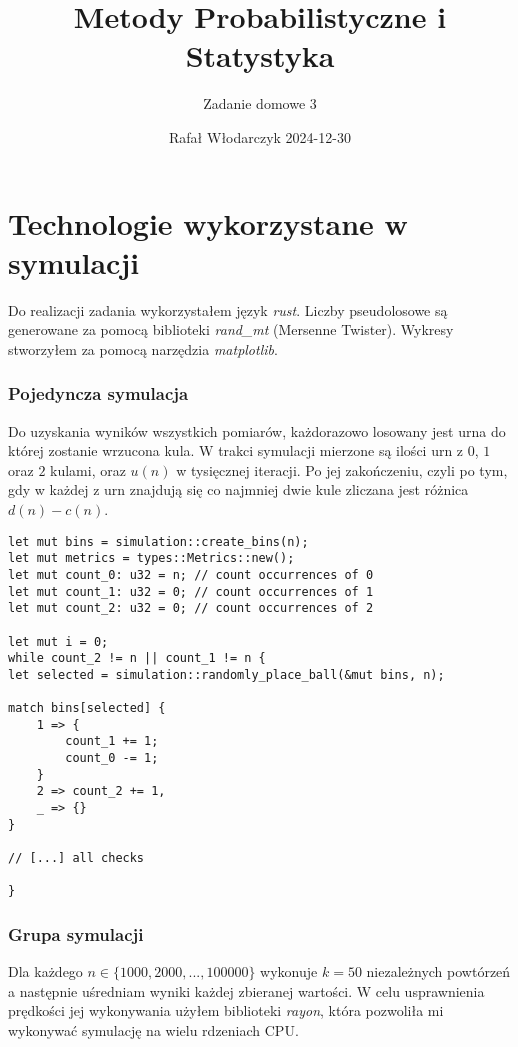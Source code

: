 \documentclass{article}
\title{Metody Probabilistyczne i Statystyka}
\author{Zadanie domowe 3}
\date{Rafał Włodarczyk 2024-12-30}
\begin{document}
\maketitle

\tableofcontents

\section{Technologie wykorzystane w symulacji}

Do realizacji zadania wykorzystałem język \textit{rust}. Liczby pseudolosowe są generowane za pomocą biblioteki \textit{rand\_mt} (Mersenne Twister). Wykresy stworzyłem za pomocą narzędzia \textit{matplotlib}. 

\subsubsection{Pojedyncza symulacja}

Do uzyskania wyników wszystkich pomiarów, każdorazowo losowany jest urna do której zostanie wrzucona kula. W trakci symulacji mierzone są ilości urn z $0$, $1$ oraz $2$ kulami, oraz $u(n)$ w tysięcznej iteracji. Po jej zakończeniu, czyli po tym, gdy w każdej z urn znajdują się co najmniej dwie kule zliczana jest różnica $d(n)-c(n)$.

\begin{verbatim}
let mut bins = simulation::create_bins(n);
let mut metrics = types::Metrics::new();
let mut count_0: u32 = n; // count occurrences of 0
let mut count_1: u32 = 0; // count occurrences of 1
let mut count_2: u32 = 0; // count occurrences of 2

let mut i = 0;
while count_2 != n || count_1 != n {
let selected = simulation::randomly_place_ball(&mut bins, n);

match bins[selected] {
    1 => {
        count_1 += 1;
        count_0 -= 1;
    }
    2 => count_2 += 1,
    _ => {}
}

// [...] all checks

}
\end{verbatim}

\subsubsection{Grupa symulacji}

Dla każdego $n\in\{1000,2000,...,100000\}$ wykonuje $k=50$ niezależnych powtórzeń a następnie uśredniam wyniki każdej zbieranej wartości. W celu usprawnienia prędkości jej wykonywania użyłem biblioteki \textit{rayon}, która pozwoliła mi wykonywać symulację na wielu rdzeniach CPU.
\end{document}
